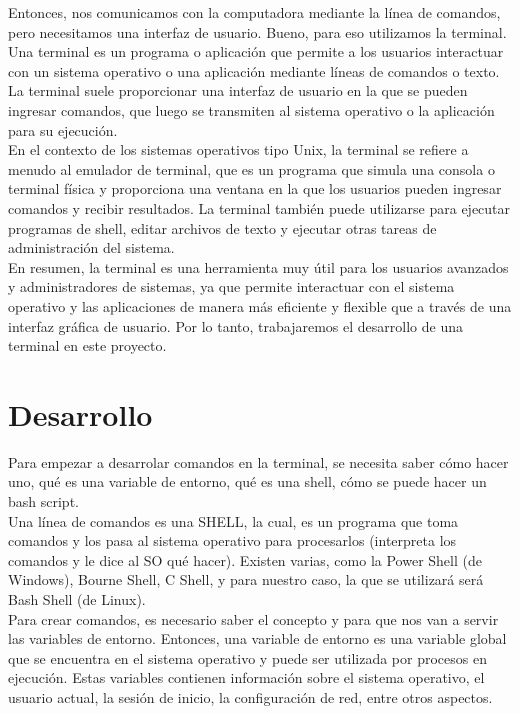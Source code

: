 \documentclass{article}
\begin{document}
Entonces, nos comunicamos con la computadora mediante la línea de comandos, pero necesitamos una interfaz de usuario. Bueno, para eso utilizamos la terminal.\\

Una terminal es un programa o aplicación que permite a los usuarios interactuar con un sistema operativo o una aplicación mediante líneas de comandos o texto. La terminal suele proporcionar una interfaz de usuario en la que se pueden ingresar comandos, que luego se transmiten al sistema operativo o la aplicación para su ejecución.\\

En el contexto de los sistemas operativos tipo Unix, la terminal se refiere a menudo al emulador de terminal, que es un programa que simula una consola o terminal física y proporciona una ventana en la que los usuarios pueden ingresar comandos y recibir resultados. La terminal también puede utilizarse para ejecutar programas de shell, editar archivos de texto y ejecutar otras tareas de administración del sistema.\\

En resumen, la terminal es una herramienta muy útil para los usuarios avanzados y administradores de sistemas, ya que permite interactuar con el sistema operativo y las aplicaciones de manera más eficiente y flexible que a través de una interfaz gráfica de usuario. Por lo tanto, trabajaremos el desarrollo de una terminal en este proyecto.\\

\section{Desarrollo}

Para empezar a desarrolar comandos en la terminal, se necesita saber c\'omo hacer uno, qu\'e es una variable de entorno, qu\'e es una shell, c\'omo se puede hacer un bash script.\\

Una l\'inea de comandos es una SHELL, la cual, es un programa que toma comandos y los pasa al sistema operativo para procesarlos (interpreta los comandos y le dice al SO qu\'e hacer). Existen varias, como la Power Shell (de Windows), Bourne Shell, C Shell, y para nuestro caso, la que se utilizar\'a ser\'a Bash Shell (de Linux).\\

Para crear comandos, es necesario saber el concepto y para que nos van a servir las variables de entorno. Entonces, una variable de entorno es una variable global que se encuentra en el sistema operativo y puede ser utilizada por procesos en ejecución. Estas variables contienen información sobre el sistema operativo, el usuario actual, la sesión de inicio, la configuración de red, entre otros aspectos.\\
\end{document}
